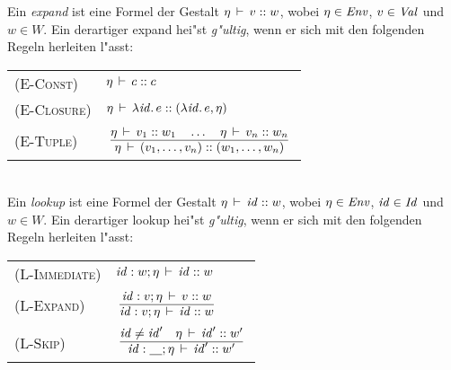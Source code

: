 \documentclass[12pt,fleqn,a4paper]{article}
\newcommand{\RN}[1]{\mbox{\textsc{(#1)}}}
\newcommand{\cl}{\name{cl}}
\begin{document}

\begin{definition}
  Ein \emph{expand} ist eine Formel der Gestalt $\eta\,\vdash\,v\mathrel{::} w$, wobei $\eta\in{\text{\it Env\/}}$, $v\in{\text{\it Val\/}}$ und $w\in W$.
  Ein derartiger expand hei"st \emph{g"ultig}, wenn er sich mit den folgenden Regeln herleiten l"asst: \\[5mm]
  \begin{tabular}{ll}
    \RN{E-Const}   & $\eta\,\vdash\,c\mathrel{::} c$ \\[1mm]
    \RN{E-Closure} & $\eta\,\vdash\,\lambda {\text{\it id\/}}.\,e\mathrel{::}(\lambda {\text{\it id\/}}.\,e,\eta)$ \\[1mm]
    \RN{E-Tuple}   & $\regel{\Lj{\eta}{v_1}{w_1} \quad\ldots\quad \Lj{\eta}{v_n}{w_n}}
                            {\Lj{\eta}{(v_1,\ldots,v_n)}{(w_1,\ldots,w_n)}}$ \\[3mm]
  \end{tabular} \\[2mm]
  Ein \emph{lookup} ist eine Formel der Gestalt $\eta\,\vdash\,{\text{\it id\/}}\mathrel{::} w$, wobei $\eta\in{\text{\it Env\/}}$, ${\text{\it id\/}}\in{\text{\it Id\/}}$ und
  $w \in W$. Ein derartiger lookup hei"st \emph{g"ultig}, wenn er sich mit den folgenden Regeln herleiten
  l"asst: \\[5mm]
  \begin{tabular}{ll}
    \RN{L-Immediate} & ${\text{\it id\/}}:w;\eta\,\vdash\,{\text{\it id\/}}\mathrel{::} w$ \\[1mm]
    \RN{L-Expand}    & $\regel{\Lj{\id:v;\eta}{v}{w}}
                              {\Lj{\id:v;\eta}{\id}{w}}$ \\[3mm]
    \RN{L-Skip}      & $\regel{\id \ne \id' \quad \Lj{\eta}{\id'}{w'}}
                              {\Lj{\id:\underline{\quad};\eta}{\id'}{w'}}$ \\[3mm]
  \end{tabular}
\end{definition}
\end{document}
